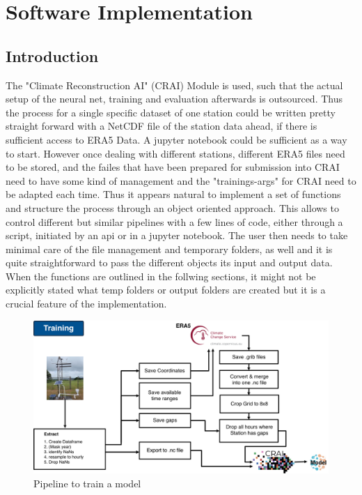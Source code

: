 \section{Software Implementation}
\label{sec:implementation}

\subsection{Introduction}

The "Climate Reconstruction AI" (CRAI) Module is used, such that the actual setup of the neural net, training and evaluation afterwards is outsourced. Thus the process for a single specific dataset of one station could be written pretty straight forward with a NetCDF file of the station data ahead, if there is sufficient access to ERA5 Data. A jupyter notebook could be sufficient as a way to start. However once dealing with different stations, different ERA5 files need to be stored, and the failes that have been prepared for submission into CRAI need to have some kind of management and the "trainings-args" for CRAI need to be adapted each time. Thus it appears natural to implement a set of functions and structure the process through an object oriented approach. This allows to control different but similar pipelines with a few lines of code, either through a script, initiated by an api or in a jupyter notebook.
The user then needs to take minimal care of the file management and temporary folders, as well and it is quite straightforward to pass the different objects its input and output data. When the functions are outlined in the follwing sections, it might not be explicitly stated what temp folders or output folders are created but it is a crucial feature of the implementation.

\begin{figure}
    \centering
    \includegraphics[width=450pt]{resources/images/training_pipeline.png}
    \caption{Pipeline to train a model}
    \label{fig:training_pipeline}
\end{figure}

